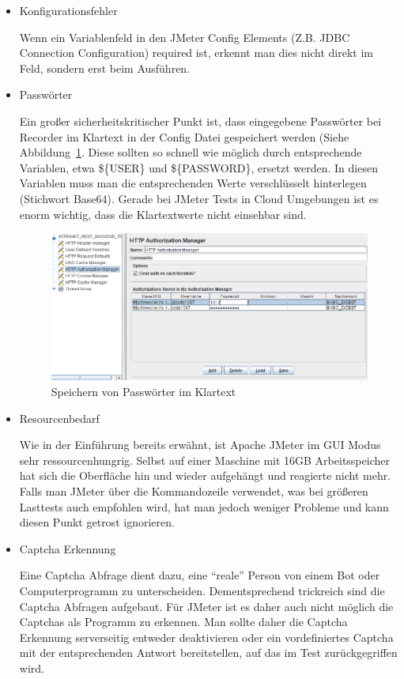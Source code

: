\documentclass[a4paper,12pt]{article}
\begin{document}
\begin{itemize}
	\item Konfigurationsfehler
	
	Wenn ein Variablenfeld in den JMeter Config Elements (Z.B. JDBC Connection Configuration) required ist, erkennt man dies nicht direkt im Feld, sondern erst beim Ausführen.
	
	\item Passwörter
	
	Ein großer sicherheitskritischer Punkt ist, dass eingegebene Passwörter bei Recorder im Klartext in der Config Datei gespeichert werden (Siehe Abbildung~\ref{fig:password}. Diese sollten so schnell wie möglich durch entsprechende Variablen, etwa \$\{USER\} und \$\{PASSWORD\}, ersetzt werden. In diesen Variablen muss man die entsprechenden Werte verschlüsselt hinterlegen (Stichwort Base64).
Gerade bei JMeter Tests in Cloud Umgebungen ist es enorm wichtig, dass die Klartextwerte nicht einsehbar sind.  

	\begin{figure}[htb]%
 \centering
    \includegraphics[width=1\textwidth]{bilder/password.png}
  \caption{Speichern von Passwörter im Klartext}
  \label{fig:password}
\end{figure}

	\item Resourcenbedarf
	
	Wie in der Einführung bereits erwähnt, ist Apache JMeter im GUI Modus sehr ressourcenhungrig. Selbst auf einer Maschine mit 16GB Arbeitsspeicher hat sich die Oberfläche hin und wieder aufgehängt und reagierte nicht mehr. Falls man JMeter über die Kommandozeile verwendet, was bei größeren Lasttests auch empfohlen wird, hat man jedoch weniger Probleme und kann diesen Punkt getrost ignorieren.

\item Captcha Erkennung

Eine Captcha Abfrage dient dazu, eine "`reale"' Person von einem Bot oder Computerprogramm zu unterscheiden. Dementsprechend trickreich sind die Captcha Abfragen aufgebaut. Für JMeter ist es daher auch nicht möglich die Captchas als Programm zu erkennen. Man sollte daher die Captcha Erkennung serverseitig entweder deaktivieren oder ein vordefiniertes Captcha mit der entsprechenden Antwort bereitstellen, auf das im Test zurückgegriffen wird.

\end{itemize}
\end{document}
